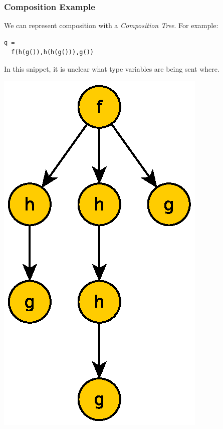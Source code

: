 \documentclass{beamer}
\begin{document}
\begin{frame}[fragile]
  \frametitle{Composition Example}

  \begin{multicols}{2}

    We can represent composition with a \emph{Composition Tree}. For
    example:
    

    \begin{lstlisting}[language=Paratype]
q = 
  f(h(g()),h(h(g())),g())
    \end{lstlisting}

    \vspace{2em}
    In this snippet, it is unclear what type variables are being sent
    where.

    \begin{center}
      \includegraphics[width=.75\linewidth]{media/composition.eps}    
    \end{center}
  \end{multicols}
\end{frame}
\end{document}
